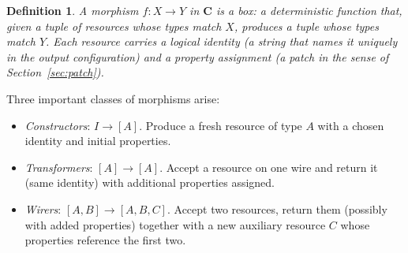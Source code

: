 \documentclass[11pt]{article}
\newtheorem{definition}[theorem]{Definition}
\newcommand{\cat}[1]{\mathbf{#1}}
\begin{document}
    \begin{definition}\label{def:morphism}
        A morphism $f \colon X \to Y$ in $\cat{C}$ is a \emph{box}: a deterministic
        function that, given a tuple of resources whose types match $X$, produces a tuple
        whose types match $Y$. Each resource carries a \emph{logical identity} (a string
        that names it uniquely in the output configuration) and a \emph{property
        assignment} (a patch in the sense of Section~\ref{sec:patch}).
    \end{definition}

    Three important classes of morphisms arise:
    \begin{itemize}
        \item \emph{Constructors}: $I \to [A]$. Produce a fresh resource of type $A$
        with a chosen identity and initial properties.
        \item \emph{Transformers}: $[A] \to [A]$. Accept a resource on one wire and
        return it (same identity) with additional properties assigned.
        \item \emph{Wirers}: $[A, B] \to [A, B, C]$. Accept two resources, return them
        (possibly with added properties) together with a new auxiliary resource $C$ whose
        properties reference the first two.
    \end{itemize}
\end{document}
